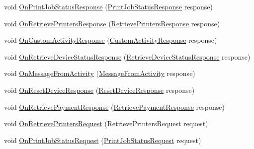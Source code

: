 \begin{DoxyCompactItemize}
void \hyperlink{interfacecom_1_1clover_1_1remotepay_1_1sdk_1_1_i_clover_connector_listener_a37d3d2607d2a424980bf22c59bedcf9b}{On\+Print\+Job\+Status\+Response} (\hyperlink{classcom_1_1clover_1_1remotepay_1_1sdk_1_1_print_job_status_response}{Print\+Job\+Status\+Response} response)
\item 
void \hyperlink{interfacecom_1_1clover_1_1remotepay_1_1sdk_1_1_i_clover_connector_listener_ad140361fb09060287f6fde7e5ff79c2c}{On\+Retrieve\+Printers\+Response} (\hyperlink{classcom_1_1clover_1_1remotepay_1_1sdk_1_1_retrieve_printers_response}{Retrieve\+Printers\+Response} response)
\item 
void \hyperlink{interfacecom_1_1clover_1_1remotepay_1_1sdk_1_1_i_clover_connector_listener_aee5ad989a0eeb2dea5149a212ca94488}{On\+Custom\+Activity\+Response} (\hyperlink{classcom_1_1clover_1_1remotepay_1_1sdk_1_1_custom_activity_response}{Custom\+Activity\+Response} response)
\item 
void \hyperlink{interfacecom_1_1clover_1_1remotepay_1_1sdk_1_1_i_clover_connector_listener_a2ce59dcc916f95bcb88f9e25deccd92f}{On\+Retrieve\+Device\+Status\+Response} (\hyperlink{classcom_1_1clover_1_1remotepay_1_1sdk_1_1_retrieve_device_status_response}{Retrieve\+Device\+Status\+Response} response)
\item 
void \hyperlink{interfacecom_1_1clover_1_1remotepay_1_1sdk_1_1_i_clover_connector_listener_aae1ff245e0722b012a8cdcb5e7310610}{On\+Message\+From\+Activity} (\hyperlink{classcom_1_1clover_1_1remotepay_1_1sdk_1_1_message_from_activity}{Message\+From\+Activity} response)
\item 
void \hyperlink{interfacecom_1_1clover_1_1remotepay_1_1sdk_1_1_i_clover_connector_listener_aa3c9d76aad1d434a7ca72276c0b9c1eb}{On\+Reset\+Device\+Response} (\hyperlink{classcom_1_1clover_1_1remotepay_1_1sdk_1_1_reset_device_response}{Reset\+Device\+Response} response)
\item 
void \hyperlink{interfacecom_1_1clover_1_1remotepay_1_1sdk_1_1_i_clover_connector_listener_a80b66ca256c60f88d9c3bc1bf7df1a25}{On\+Retrieve\+Payment\+Response} (\hyperlink{classcom_1_1clover_1_1remotepay_1_1sdk_1_1_retrieve_payment_response}{Retrieve\+Payment\+Response} response)
\item 
void \hyperlink{interfacecom_1_1clover_1_1remotepay_1_1sdk_1_1_i_clover_connector_listener_a46e8cf10c41e685ef7d496612219f817}{On\+Retrieve\+Printers\+Request} (Retrieve\+Printers\+Request request)
\item 
void \hyperlink{interfacecom_1_1clover_1_1remotepay_1_1sdk_1_1_i_clover_connector_listener_a8eb4d67d9367bf141b876d8ccc70bcc1}{On\+Print\+Job\+Status\+Request} (\hyperlink{classcom_1_1clover_1_1remotepay_1_1sdk_1_1_print_job_status_request}{Print\+Job\+Status\+Request} request)
\end{DoxyCompactItemize}


